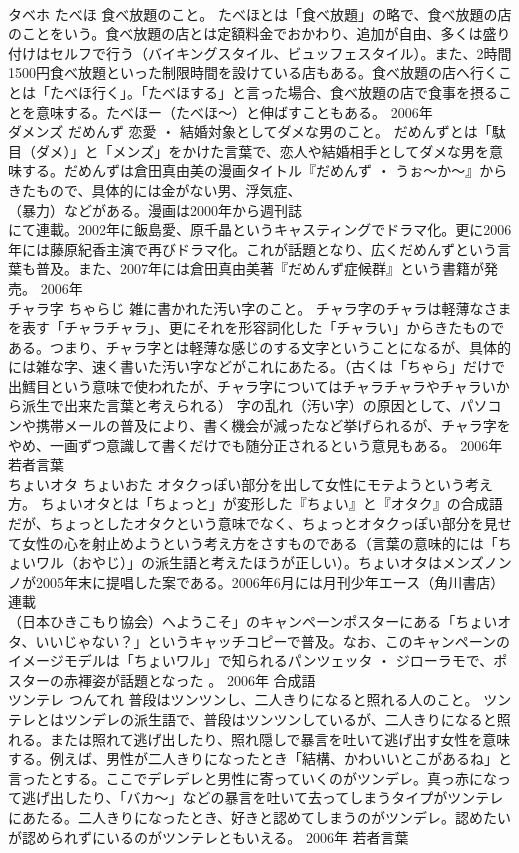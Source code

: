 \documentclass[8pt]{extreport}
\begin{document}
\begin{CJK}{UTF8}{min}
\\	タベホ	たべほ	食べ放題のこと。	たべほとは「食べ放題」の略で、食べ放題の店のことをいう。食べ放題の店とは定額料金でおかわり、追加が自由、多くは盛り付けはセルフで行う（バイキングスタイル、ビュッフェスタイル）。また、2時間1500円食べ放題といった制限時間を設けている店もある。食べ放題の店へ行くことは「たべほ行く」。「たべほする」と言った場合、食べ放題の店で食事を摂ることを意味する。たべほー（たべほ～）と伸ばすこともある。	2006年	
\\	ダメンズ	だめんず	恋愛 ・ 結婚対象としてダメな男のこと。	だめんずとは「駄目（ダメ）」と「メンズ」をかけた言葉で、恋人や結婚相手としてダメな男を意味する。だめんずは倉田真由美の漫画タイトル『だめんず ・ うぉ～か～』からきたもので、具体的には金がない男、浮気症、
\\	（暴力）などがある。漫画は2000年から週刊誌
\\	にて連載。2002年に飯島愛、原千晶というキャスティングでドラマ化。更に2006年には藤原紀香主演で再びドラマ化。これが話題となり、広くだめんずという言葉も普及。また、2007年には倉田真由美著『だめんず症候群』という書籍が発売。	2006年	
\\	チャラ字	ちゃらじ	雑に書かれた汚い字のこと。	チャラ字のチャラは軽薄なさまを表す「チャラチャラ」、更にそれを形容詞化した「チャラい」からきたものである。つまり、チャラ字とは軽薄な感じのする文字ということになるが、具体的には雑な字、速く書いた汚い字などがこれにあたる。（古くは「ちゃら」だけで出鱈目という意味で使われたが、チャラ字についてはチャラチャラやチャラいから派生で出来た言葉と考えられる） 字の乱れ（汚い字）の原因として、パソコンや携帯メールの普及により、書く機会が減ったなど挙げられるが、チャラ字をやめ、一画ずつ意識して書くだけでも随分正されるという意見もある。	2006年	若者言葉	
\\	ちょいオタ	ちょいおた	オタクっぽい部分を出して女性にモテようという考え方。	ちょいオタとは「ちょっと」が変形した『ちょい』と『オタク』の合成語だが、ちょっとしたオタクという意味でなく、ちょっとオタクっぽい部分を見せて女性の心を射止めようという考え方をさすものである（言葉の意味的には「ちょいワル（おやじ）」の派生語と考えたほうが正しい）。ちょいオタはメンズノンノが2005年末に提唱した案である。2006年6月には月刊少年エース（角川書店）連載
\\	（日本ひきこもり協会）へようこそ」のキャンペーンポスターにある「ちょいオタ、いいじゃない？」というキャッチコピーで普及。なお、このキャンペーンのイメージモデルは「ちょいワル」で知られるパンツェッタ ・ ジローラモで、ポスターの赤褌姿が話題となった 。	2006年	合成語	
\\	ツンテレ	つんてれ	普段はツンツンし、二人きりになると照れる人のこと。	ツンテレとはツンデレの派生語で、普段はツンツンしているが、二人きりになると照れる。または照れて逃げ出したり、照れ隠しで暴言を吐いて逃げ出す女性を意味する。例えば、男性が二人きりになったとき「結構、かわいいとこがあるね」と言ったとする。ここでデレデレと男性に寄っていくのがツンデレ。真っ赤になって逃げ出したり、「バカ～」などの暴言を吐いて去ってしまうタイプがツンテレにあたる。二人きりになったとき、好きと認めてしまうのがツンデレ。認めたいが認められずにいるのがツンテレともいえる。	2006年	若者言葉	

\end{CJK}
\end{document}
